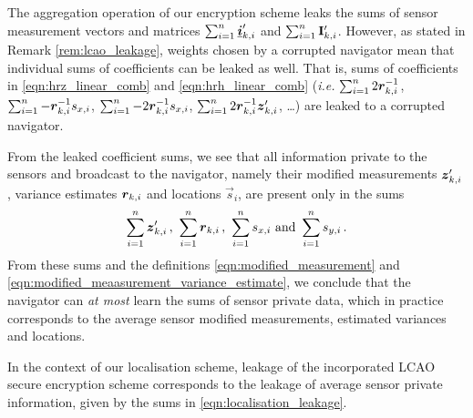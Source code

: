\documentclass[twocolumn]{autart}
\begin{document}
The aggregation operation of our encryption scheme leaks the sums of sensor measurement vectors and matrices $\sum_{i=1}^n{\boldsymbol{\underline{i}}}'_{k,i}$ and $\sum_{i=1}^n{{\mathbf{I}}}'_{k,i}$. However, as stated in Remark \ref{rem:lcao_leakage}, weights chosen by a corrupted navigator mean that individual sums of coefficients can be leaked as well. That is, sums of coefficients in \eqref{eqn:hrz_linear_comb} and \eqref{eqn:hrh_linear_comb} (\textit{i.e.} $\sum_{i=1}^n2{\boldsymbol{r}}^{-1}_{k,i}$, $\sum_{i=1}^n-{\boldsymbol{r}}^{-1}_{k,i}s_{x,i}$, $\sum_{i=1}^n-2{\boldsymbol{r}}^{-1}_{k,i}s_{x,i}$, $\sum_{i=1}^n2{\boldsymbol{r}}^{-1}_{k,i}{\boldsymbol{z}}'_{k,i}$, \dots) are leaked to a corrupted navigator.

From the leaked coefficient sums, we see that all information private to the sensors and broadcast to the navigator, namely their modified measurements ${\boldsymbol{z}}'_{k,i}$, variance estimates ${\boldsymbol{r}}_{k,i}$ and locations $\vec{s}_i$, are present only in the sums
\begin{equation}
    \sum_{i=1}^n\rv{z}'_{k,i}\,,\ \sum_{i=1}^n\rv{r}_{k,i}\,,\ \sum_{i=1}^ns_{x,i}\ \textrm{and}\ \sum_{i=1}^ns_{y,i}\,.\label{eqn:localisation_leakage}
\end{equation}
From these sums and the definitions \eqref{eqn:modified_measurement} and \eqref{eqn:modified_meaasurement_variance_estimate}, we conclude that the navigator can \textit{at most} learn the sums of sensor private data, which in practice corresponds to the average sensor modified measurements, estimated variances and locations.
\begin{thm}
    In the context of our localisation scheme, leakage of the incorporated LCAO secure encryption scheme corresponds to the leakage of average sensor private information, given by the sums in \eqref{eqn:localisation_leakage}.
\end{thm}

% 
%                                                                          
%                                                                          
%                                                                          
% 
\end{document}
